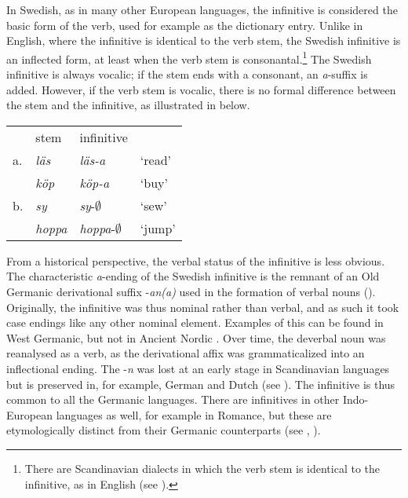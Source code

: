 \documentclass[output=paper]{langscibook}
\begin{document}
In Swedish, as in many other European languages, the infinitive is considered the basic form of the verb, used for example as the dictionary entry. Unlike in English, where the infinitive is identical to the verb stem, the Swedish infinitive is an inflected form, at least when the verb stem is consonantal.\footnote{There are Scandinavian dialects in which the verb stem is identical to the infinitive, as in English (see \citealt{Delsing2014Verbsystemet}).}  The Swedish infinitive is always vocalic; if the stem ends with a consonant, an \textit{a}{}-suffix is added. However, if the verb stem is vocalic, there is no formal difference between the stem and the infinitive, as illustrated in  below. 


\ea\label{ex:kalm:2}
\begin{tabular}[t]{llll}
{} & stem & infinitive & {}\\
a. & \textit{läs} & \textit{läs-a} & ‘read’\\
{} & \textit{köp} & \textit{köp-a} & ‘buy’\\	
b. & \textit{sy} & \textit{sy}{}-${\emptyset}$ & ‘sew’\\
{} & \textit{hoppa} & \textit{hoppa}{}-${\emptyset}$ & ‘jump’\\
\end{tabular}
\z

From a historical perspective, the verbal status of the infinitive is less obvious. The characteristic \textit{a}{}-ending of the Swedish infinitive is the remnant of an Old Germanic derivational suffix -\textit{an(a)} used in the formation of verbal nouns (\citealt[193]{FalkTorp1900}). Originally, the infinitive was thus nominal rather than verbal, and as such it took case endings like any other nominal element. Examples of this can be found in West Germanic, but not in Ancient Nordic \citep[205]{Prokosch1939}. Over time, the deverbal noun was reanalysed as a verb, as the derivational affix was grammaticalized into an inflectional ending. The -\textit{n} was lost at an early stage in Scandinavian languages but is preserved in, for example, German and Dutch (see \citealt[636]{Noreen1898}). The infinitive is thus common to all the Germanic languages. There are infinitives in other Indo-European languages as well, for example in Romance, but these are etymologically distinct from their Germanic counterparts (see \citealt[205]{Prokosch1939}, \citealt[193]{FalkTorp1900}).
\end{document}
